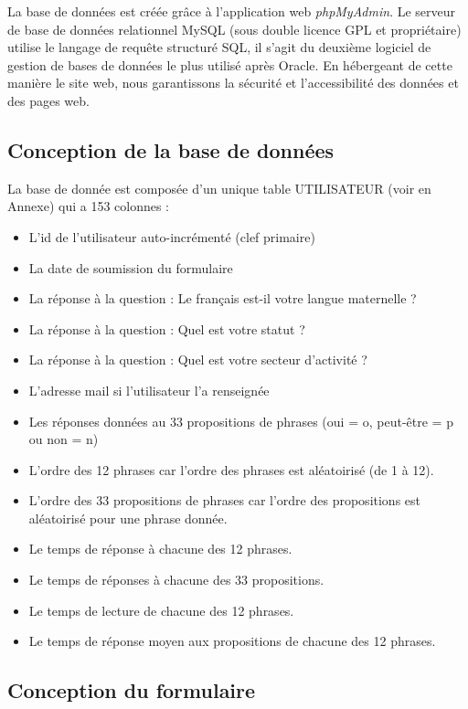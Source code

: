 \documentclass[11pt,letterpaper]{article}
\begin{document}
La base de données est créée grâce à l'application web \textit{phpMyAdmin}. Le serveur de base de données relationnel MySQL (sous double licence GPL et propriétaire) utilise le langage de requête structuré SQL, il s'agit du deuxième logiciel de gestion de bases de données le plus utilisé après Oracle. En hébergeant de cette manière le site web, nous garantissons la sécurité et l'accessibilité des données et des pages web.

\subsection{Conception de la base de données}

La base de donnée est composée d'un unique table UTILISATEUR (voir en Annexe) qui a 153 colonnes : 
\begin{itemize}
    \item L'id de l'utilisateur auto-incrémenté (clef primaire)
    \item La date de soumission du formulaire
    \item La réponse à la question : \og Le français est-il votre langue maternelle ?\fg{}
    \item La réponse à la question : \og Quel est votre statut ?\fg{}
    \item La réponse à la question : \og Quel est votre secteur d'activité ?\fg{}
    \item L'adresse mail si l'utilisateur l'a renseignée
    \item Les réponses données au 33 propositions de phrases (oui = \og o\fg{}, peut-être =  \og p\fg{} ou non =  \og n\fg{})
    \item L'ordre des 12 phrases car l'ordre des phrases est aléatoirisé (de 1 à 12).
    \item L'ordre des 33 propositions de phrases car l'ordre des propositions est aléatoirisé pour une phrase donnée.
    \item Le temps de réponse à chacune des 12 phrases.
    \item Le temps de réponses à chacune des 33 propositions.
    \item Le temps de lecture de chacune des 12 phrases.
    \item Le temps de réponse moyen aux propositions de chacune des 12 phrases.
\end{itemize}


\subsection{Conception du formulaire}
\end{document}
